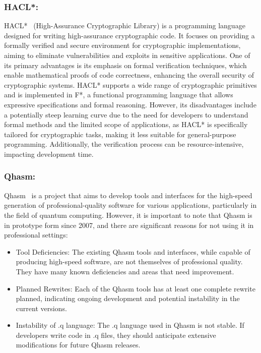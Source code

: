 \documentclass[runningheads]{llncs}
\begin{document}
\subsubsection{HACL*:}
HACL*~\cite{hacl_star_paper} (High-Assurance Cryptographic Library) is a programming language designed for writing high-assurance cryptographic code. It focuses on providing a formally verified and secure environment for cryptographic implementations, aiming to eliminate vulnerabilities and exploits in sensitive applications. One of its primary advantages is its emphasis on formal verification techniques, which enable mathematical proofs of code correctness, enhancing the overall security of cryptographic systems. HACL* supports a wide range of cryptographic primitives and is implemented in F*, a functional programming language that allows expressive specifications and formal reasoning. However, its disadvantages include a potentially steep learning curve due to the need for developers to understand formal methods and the limited scope of applications, as HACL* is specifically tailored for cryptographic tasks, making it less suitable for general-purpose programming. Additionally, the verification process can be resource-intensive, impacting development time.


\subsubsection{Qhasm:}
 Qhasm~\cite{qhasm} is a project that aims to develop tools and interfaces for the high-speed generation of professional-quality software for various applications, particularly in the field of quantum computing.
However, it is important to note that Qhasm is in prototype form since 2007, and there are significant reasons for not using it in professional settings:
\begin{itemize}
    \item Tool Deficiencies: The existing Qhasm tools and interfaces, while capable of producing high-speed software, are not themselves of professional quality. They have many known deficiencies and areas that need improvement.
    \item Planned Rewrites: Each of the Qhasm tools has at least one complete rewrite planned, indicating ongoing development and potential instability in the current versions.
    \item Instability of .q language: The .q language used in Qhasm is not stable. If developers write code in .q files, they should anticipate extensive modifications for future Qhasm releases.
\end{itemize}
\end{document}
